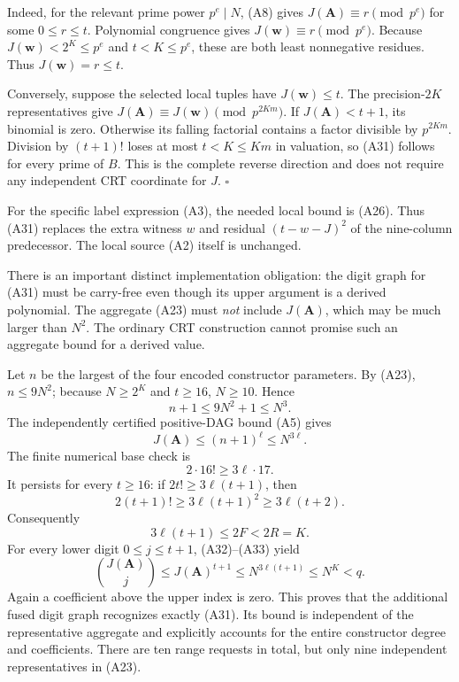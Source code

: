 Indeed, for the relevant prime power \(p^e\mid N\), (A8) gives
\(J(\mathbf A)\equiv r\pmod{p^e}\) for some \(0\le r\le t\).
Polynomial congruence gives \(J(\mathbf w)\equiv r\pmod{p^e}\).
Because \(J(\mathbf w)<2^K\le p^e\) and \(t<K\le p^e\),
these are both least nonnegative residues.  Thus \(J(\mathbf w)=r\le t\).

Conversely, suppose the selected local tuples have \(J(\mathbf w)\le t\).
The precision-\(2K\) representatives give
\(J(\mathbf A)\equiv J(\mathbf w)\pmod{p^{2Km}}\).
If \(J(\mathbf A)<t+1\), its binomial is zero.  Otherwise its falling
factorial contains a factor divisible by \(p^{2Km}\).
Division by \((t+1)!\) loses at most \(t<K\le Km\) in valuation,
so (A31) follows for every prime of \(B\).
This is the complete reverse direction and does not require any
independent CRT coordinate for \(J\).
\hfill\(\square\)

For the specific label expression (A3), the needed local bound is
(A26).  Thus (A31) replaces the extra witness \(w\) and residual
\((t-w-J)^2\) of the nine-column predecessor.  The local source
(A2) itself is unchanged.

There is an important distinct implementation obligation:
the digit graph for (A31) must be carry-free even though its upper
argument is a derived polynomial.  The aggregate (A23) must
\emph{not} include \(J(\mathbf A)\), which may be much larger than
\(N^2\).  The ordinary CRT construction cannot promise such an
aggregate bound for a derived value.

Let \(n\) be the largest of the four encoded constructor parameters.
By (A23), \(n\le9N^2\); because \(N\ge2^K\) and \(t\ge16\),
\(N\ge10\).  Hence
\[
 n+1\le9N^2+1\le N^3.
\]
The independently certified positive-DAG bound (A5) gives
\[
 J(\mathbf A)\le(n+1)^\ell\le N^{3\ell}.                \tag{A32}
\]
The finite numerical base check is
\[
 2\cdot16!\ge3\ell\cdot17.
\]
It persists for every \(t\ge16\): if
\(2t!\ge3\ell(t+1)\), then
\[
 2(t+1)!\ge3\ell(t+1)^2\ge3\ell(t+2).
\]
Consequently
\[
 3\ell(t+1)\le2F<2R=K.                                \tag{A33}
\]
For every lower digit \(0\le j\le t+1\), (A32)--(A33) yield
\[
 \binom{J(\mathbf A)}j
 \le J(\mathbf A)^{t+1}
 \le N^{3\ell(t+1)}
 \le N^K<q.                                           \tag{A34}
\]
Again a coefficient above the upper index is zero.
This proves that the additional fused digit graph recognizes exactly
(A31).  Its bound is independent of the representative aggregate and
explicitly accounts for the entire constructor degree and coefficients.
There are ten range requests in total, but only nine independent
representatives in (A23).

